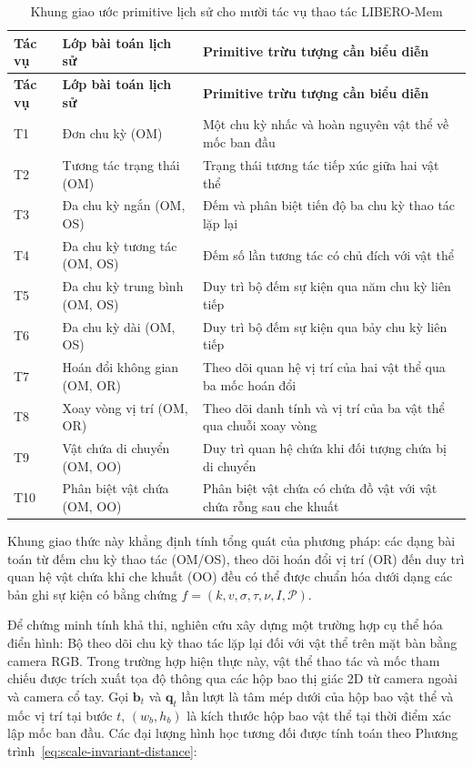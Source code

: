 \begingroup\small\setlength{\tabcolsep}{4pt}\renewcommand{\arraystretch}{1.12}
\begin{longtable}{>{\raggedright\arraybackslash}p{}>{\raggedright\arraybackslash}p{}>{\raggedright\arraybackslash}p{}}
\caption{Khung giao ước primitive lịch sử cho mười tác vụ thao tác LIBERO-Mem}\label{tab:memory-task-families}\\
\toprule
\textbf{Tác vụ} & \textbf{Lớp bài toán lịch sử} & \textbf{Primitive trừu tượng cần biểu diễn} \\
\midrule\endfirsthead
\toprule
\textbf{Tác vụ} & \textbf{Lớp bài toán lịch sử} & \textbf{Primitive trừu tượng cần biểu diễn} \\
\midrule\endhead
\bottomrule\endfoot
T1 & Đơn chu kỳ (OM) & Một chu kỳ nhấc và hoàn nguyên vật thể về mốc ban đầu \\
T2 & Tương tác trạng thái (OM) & Trạng thái tương tác tiếp xúc giữa hai vật thể \\
T3 & Đa chu kỳ ngắn (OM, OS) & Đếm và phân biệt tiến độ ba chu kỳ thao tác lặp lại \\
T4 & Đa chu kỳ tương tác (OM, OS) & Đếm số lần tương tác có chủ đích với vật thể \\
T5 & Đa chu kỳ trung bình (OM, OS) & Duy trì bộ đếm sự kiện qua năm chu kỳ liên tiếp \\
T6 & Đa chu kỳ dài (OM, OS) & Duy trì bộ đếm sự kiện qua bảy chu kỳ liên tiếp \\
T7 & Hoán đổi không gian (OM, OR) & Theo dõi quan hệ vị trí của hai vật thể qua ba mốc hoán đổi \\
T8 & Xoay vòng vị trí (OM, OR) & Theo dõi danh tính và vị trí của ba vật thể qua chuỗi xoay vòng \\
T9 & Vật chứa di chuyển (OM, OO) & Duy trì quan hệ chứa khi đối tượng chứa bị di chuyển \\
T10 & Phân biệt vật chứa (OM, OO) & Phân biệt vật chứa có chứa đồ vật với vật chứa rỗng sau che khuất \\
\end{longtable}
\endgroup

Khung giao thức này khẳng định tính tổng quát của phương pháp: các dạng bài toán từ đếm chu kỳ thao tác (OM/OS), theo dõi hoán đổi vị trí (OR) đến duy trì quan hệ vật chứa khi che khuất (OO) đều có thể được chuẩn hóa dưới dạng các bản ghi sự kiện có bằng chứng $f = (k, v, \sigma, \tau, \nu, I, \mathcal P)$.

Để chứng minh tính khả thi, nghiên cứu xây dựng một trường hợp cụ thể hóa điển hình: Bộ theo dõi chu kỳ thao tác lặp lại đối với vật thể trên mặt bàn bằng camera RGB. Trong trường hợp hiện thực này, vật thể thao tác và mốc tham chiếu được trích xuất tọa độ thông qua các hộp bao thị giác 2D từ camera ngoài và camera cổ tay. Gọi $\mathbf b_t$ và $\mathbf q_t$ lần lượt là tâm mép dưới của hộp bao vật thể và mốc vị trí tại bước $t$, $(w_b, h_b)$ là kích thước hộp bao vật thể tại thời điểm xác lập mốc ban đầu. Các đại lượng hình học tương đối được tính toán theo Phương trình~\eqref{eq:scale-invariant-distance}:

